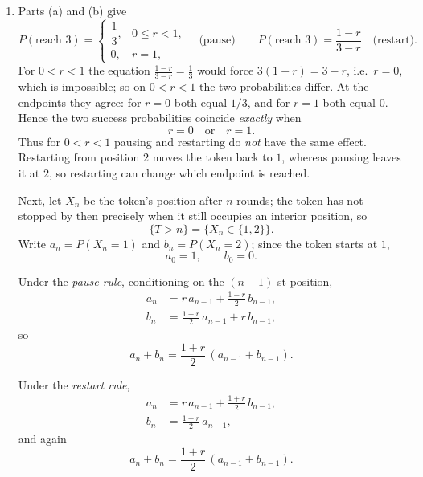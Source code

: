 \documentclass[11pt,a4paper]{article}
\newcommand{\Prob}{P}
\begin{document}
\begin{enumerate}
If $r=1$ the token is reset to $1$ every round, so it never reaches $3$;
again $q_1=0$.

Assume $0\le r<1$. As before the first equation yields $q_1=q_2/2$, and
substituting into the second,
\[
q_2=\frac{1+r}{2}\cdot\frac{q_2}{2}+\frac{1-r}{2}
\quad\Longrightarrow\quad
q_2\Bigl(1-\frac{1+r}{4}\Bigr)=\frac{1-r}{2}
\quad\Longrightarrow\quad
q_2\,\frac{3-r}{4}=\frac{1-r}{2},
\]
so
\[
q_2=\frac{2(1-r)}{3-r},\qquad q_1=\frac{1-r}{3-r},
\]
which also equals $0$ at $r=1$. Thus under the restart rule
\[
\Prob(\text{reaching position }3)=\frac{1-r}{3-r}\qquad (0\le r\le 1).
\]

\item Parts (a) and (b) give
\[
\Prob(\text{reach }3)=
\begin{cases}
\dfrac13, & 0\le r<1,\\[2mm]
0, & r=1,
\end{cases}
\quad\text{(pause)}
\qquad
\Prob(\text{reach }3)=\frac{1-r}{3-r}
\quad\text{(restart)} .
\]
For $0<r<1$ the equation $\frac{1-r}{3-r}=\frac13$ would force
$3(1-r)=3-r$, i.e.\ $r=0$, which is impossible; so on $0<r<1$ the two
probabilities differ. At the endpoints they agree: for $r=0$ both equal
$1/3$, and for $r=1$ both equal $0$. Hence the two success probabilities
coincide \emph{exactly} when
\[
r=0 \quad\text{or}\quad r=1 .
\]
Thus for $0<r<1$ pausing and restarting do \emph{not} have the same effect.
Restarting from position $2$ moves the token back to $1$, whereas pausing
leaves it at $2$, so restarting can change which endpoint is reached.

Next, let $X_n$ be the token's position
after $n$ rounds; the token has not stopped by then precisely when it still
occupies an interior position, so
\[
\{T>n\}=\{X_n\in\{1,2\}\}.
\]
Write $a_n=\Prob(X_n=1)$ and $b_n=\Prob(X_n=2)$; since the token starts at $1$,
\[
a_0=1,\qquad b_0=0 .
\]

Under the \emph{pause rule}, conditioning on the $(n-1)$-st position,
\begin{align*}
a_n &= r\,a_{n-1}+\frac{1-r}{2}\,b_{n-1},\\
b_n &= \frac{1-r}{2}\,a_{n-1}+r\,b_{n-1},
\end{align*}
so
\[
a_n+b_n=\frac{1+r}{2}\,(a_{n-1}+b_{n-1}).
\]

Under the \emph{restart rule},
\begin{align*}
a_n &= r\,a_{n-1}+\frac{1+r}{2}\,b_{n-1},\\
b_n &= \frac{1-r}{2}\,a_{n-1},
\end{align*}
and again
\[
a_n+b_n=\frac{1+r}{2}\,(a_{n-1}+b_{n-1}).
\]


\end{enumerate}
\end{document}
